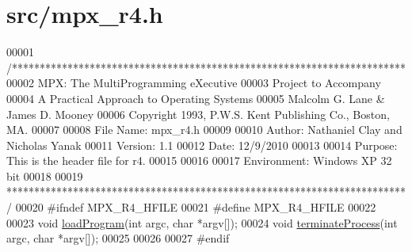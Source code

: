 \hypertarget{mpx__r4_8h_source}{
\section{src/mpx\_\-r4.h}
}

\begin{DoxyCode}
00001 \textcolor{comment}{/***********************************************************************}
00002 \textcolor{comment}{        MPX: The MultiProgramming eXecutive}
00003 \textcolor{comment}{        Project to Accompany}
00004 \textcolor{comment}{        A Practical Approach to Operating Systems}
00005 \textcolor{comment}{        Malcolm G. Lane & James D. Mooney}
00006 \textcolor{comment}{        Copyright 1993, P.W.S. Kent Publishing Co., Boston, MA.}
00007 \textcolor{comment}{}
00008 \textcolor{comment}{        File Name:      mpx\_r4.h}
00009 \textcolor{comment}{}
00010 \textcolor{comment}{        Author: Nathaniel Clay and Nicholas Yanak}
00011 \textcolor{comment}{        Version: 1.1}
00012 \textcolor{comment}{        Date:  12/9/2010}
00013 \textcolor{comment}{}
00014 \textcolor{comment}{        Purpose: This is the header file for r4.}
00015 \textcolor{comment}{}
00016 \textcolor{comment}{                }
00017 \textcolor{comment}{        Environment: Windows XP 32 bit}
00018 \textcolor{comment}{}
00019 \textcolor{comment}{************************************************************************/}
00020 \textcolor{preprocessor}{#ifndef MPX\_R4\_HFILE}
00021 \textcolor{preprocessor}{}\textcolor{preprocessor}{#define MPX\_R4\_HFILE}
00022 \textcolor{preprocessor}{}
00023 \textcolor{keywordtype}{void} \hyperlink{mpx__r4_8c_a794e5f6c45d4d9b18fff6a530ce90f86}{loadProgram}(\textcolor{keywordtype}{int} argc, \textcolor{keywordtype}{char} *argv[]);
00024 \textcolor{keywordtype}{void} \hyperlink{mpx__r4_8c_aaa714b85ce262f949d018430daf6da00}{terminateProcess}(\textcolor{keywordtype}{int} argc, \textcolor{keywordtype}{char} *argv[]);
00025 
00026 
00027 \textcolor{preprocessor}{#endif}
\end{DoxyCode}
